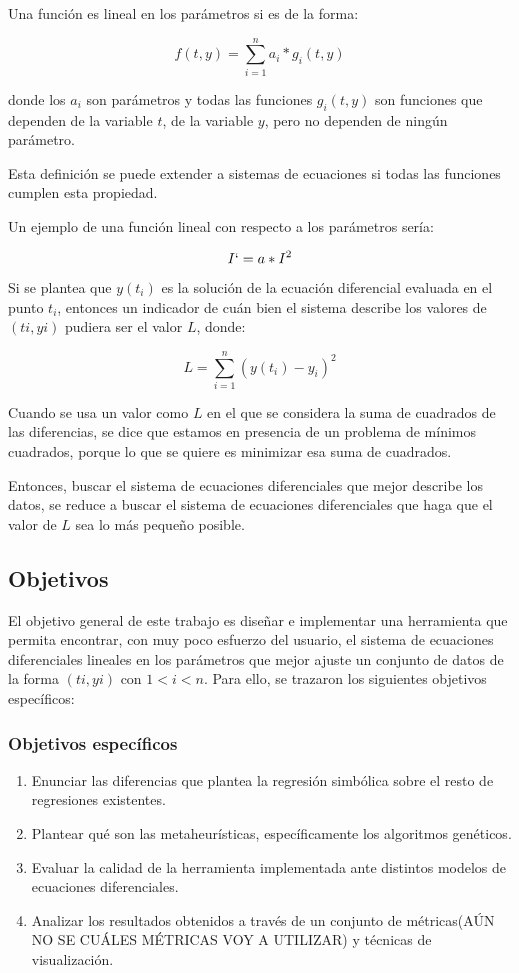 Una función es lineal en los parámetros si es de la forma:

$$f(t,y) = \sum_{i=1}^{n} a_i * g_i(t, y)$$

donde los $a_i$ son parámetros y todas las funciones $g_i(t,y)$ son funciones que dependen de la variable $t$, de la variable $y$, pero no dependen de ningún parámetro.

Esta definición se puede extender a sistemas de ecuaciones si todas las funciones cumplen esta propiedad.

Un ejemplo de una función lineal con respecto a los parámetros sería:

$$I` = a * I^2$$

Si se plantea que $y(t_i)$ es la solución de la ecuación diferencial evaluada en el punto $t_i$, entonces un indicador de cuán bien el sistema describe los valores de $(ti, yi)$ pudiera ser el valor $L$, donde:

$$L = \sum_{i=1}^{n} (y(t_i) - y_i)^2$$

Cuando se usa un valor como $L$ en el que se considera la suma de cuadrados de las diferencias, se dice que estamos en presencia de un problema de mínimos cuadrados, porque lo que se quiere es minimizar esa suma de cuadrados.

Entonces, buscar el sistema de ecuaciones diferenciales que mejor describe los datos, se reduce a buscar el sistema de ecuaciones diferenciales que haga que el valor de $L$ sea lo más pequeño posible.

\subsection*{Objetivos}

El objetivo general de este trabajo es diseñar e implementar una herramienta que permita encontrar, con muy poco esfuerzo del usuario, el sistema de ecuaciones diferenciales lineales en los parámetros que mejor ajuste un conjunto de datos de la forma $(ti, yi)$ con $1 < i < n$. Para ello, se trazaron los siguientes objetivos específicos:


\subsubsection*{Objetivos específicos}

\begin{enumerate}
    \item Enunciar las diferencias que plantea la regresión simbólica sobre el resto de regresiones existentes.
    \item Plantear qué son las metaheurísticas, específicamente los algoritmos genéticos.
    \item Evaluar la calidad de la herramienta implementada ante distintos modelos de ecuaciones diferenciales.
    \item Analizar los resultados obtenidos a través de un conjunto de métricas(AÚN NO SE CUÁLES MÉTRICAS VOY A UTILIZAR) y técnicas de visualización.
\end{enumerate}

